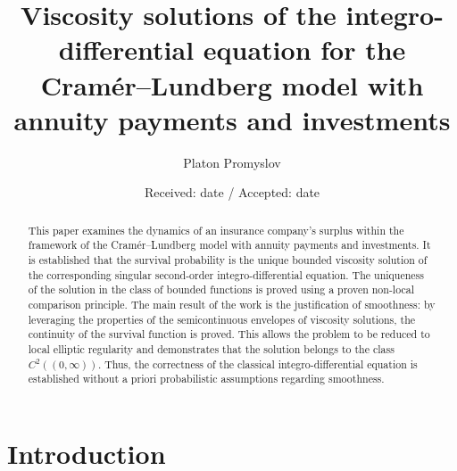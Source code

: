 \documentclass[smallextended]{svjour3}
\begin{document}
\title{Viscosity solutions of the integro-differential equation for the Cram\'{e}r--Lundberg model with annuity payments and investments}


\author{Platon Promyslov}



\date{Received: date / Accepted: date}

\maketitle

\begin{abstract}
This paper examines the dynamics of an insurance company's surplus within the framework of the Cram\'{e}r--Lundberg model with annuity payments and investments. It is established that the survival probability is the unique bounded viscosity solution of the corresponding singular second-order integro-differential equation. The uniqueness of the solution in the class of bounded functions is proved using a proven non-local comparison principle. The main result of the work is the justification of smoothness: by leveraging the properties of the semicontinuous envelopes of viscosity solutions, the continuity of the survival function is proved. This allows the problem to be reduced to local elliptic regularity and demonstrates that the solution belongs to the class $C^2((0,\infty))$. Thus, the correctness of the classical integro-differential equation is established without a priori probabilistic assumptions regarding smoothness.

\end{abstract}

\section{Introduction}
\end{document}
